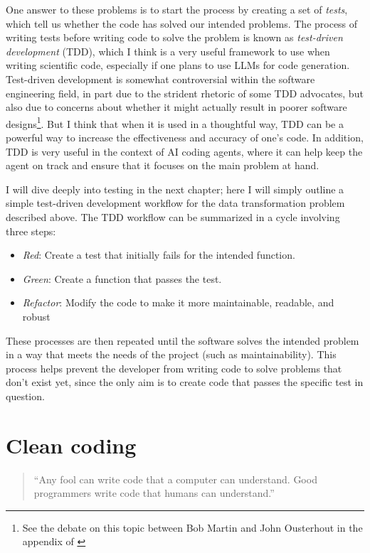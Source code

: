 One answer to these problems is to start the process by creating a set of \textit{tests}, which tell us whether the code has solved our intended problems.
The process of writing tests before writing code to solve the problem is known as \textit{test-driven development} (TDD), which I think is a very useful framework to use when writing scientific code, especially if one plans to use LLMs for code generation.
Test-driven development is somewhat controversial within the software engineering field, in part due to the strident rhetoric of some TDD advocates, but also due to concerns about whether it might actually result in poorer software designs\footnote{See the debate on this topic between Bob Martin and John Ousterhout in the appendix of \cite{Martin:2025aa}}.   
But I think that when it is used in a thoughtful way, TDD can be a powerful way to increase the effectiveness and accuracy of one's code.
In addition, TDD is very useful in the context of AI coding agents, where it can help keep the agent on track and ensure that it focuses on the main problem at hand.

I will dive deeply into testing in the next chapter; here I will simply outline a simple test-driven development workflow for the data transformation problem described above.
The TDD workflow can be summarized in a cycle involving three steps:

\begin{itemize}
\item \textit{Red}: Create a test that initially fails for the intended function.
\item \textit{Green}: Create a function that passes the test.
\item \textit{Refactor}: Modify the code to make it more maintainable, readable, and robust
\end{itemize}

These processes are then repeated until the software solves the intended problem in a way that meets the needs of the project (such as maintainability).
This process helps prevent the developer from writing code to solve problems that don't exist yet, since the only aim is to create code that passes the specific test in question.

\section{Clean coding}

\begin{quote}
``Any fool can write code that a computer can understand.
Good programmers write code that humans can understand.'' \citep[][p. 10]{Fowler:1999aa}
\end{quote}

